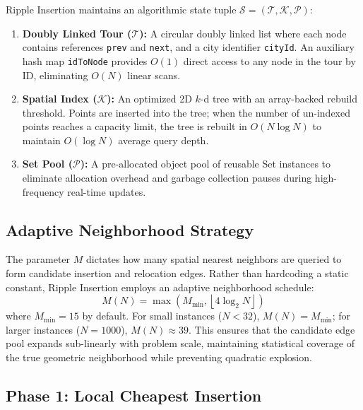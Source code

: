 \documentclass[11pt,a4paper]{article}
\theoremstyle{definition}
\begin{document}
Ripple Insertion maintains an algorithmic state tuple $\mathcal{S} = (\mathcal{T}, \mathcal{K}, \mathcal{P})$:
\begin{enumerate}
    \item \textbf{Doubly Linked Tour ($\mathcal{T}$):} A circular doubly linked list where each node contains references \texttt{prev} and \texttt{next}, and a city identifier \texttt{cityId}. An auxiliary hash map \texttt{idToNode} provides $O(1)$ direct access to any node in the tour by ID, eliminating $O(N)$ linear scans.
    \item \textbf{Spatial Index ($\mathcal{K}$):} An optimized 2D $k$-d tree \cite{bentley1975multidimensional} with an array-backed rebuild threshold. Points are inserted into the tree; when the number of un-indexed points reaches a capacity limit, the tree is rebuilt in $O(N \log N)$ to maintain $O(\log N)$ average query depth.
    \item \textbf{Set Pool ($\mathcal{P}$):} A pre-allocated object pool of reusable Set instances to eliminate allocation overhead and garbage collection pauses during high-frequency real-time updates.
\end{enumerate}

\subsection{Adaptive Neighborhood Strategy}

The parameter $M$ dictates how many spatial nearest neighbors are queried to form candidate insertion and relocation edges. Rather than hardcoding a static constant, Ripple Insertion employs an adaptive neighborhood schedule:
\begin{equation}
M(N) = \max\left(M_{\min}, \left\lfloor 4 \log_2 N \right\rfloor\right)
\end{equation}
where $M_{\min} = 15$ by default. For small instances ($N < 32$), $M(N) = M_{\min}$; for larger instances ($N = 1000$), $M(N) \approx 39$. This ensures that the candidate edge pool expands sub-linearly with problem scale, maintaining statistical coverage of the true geometric neighborhood while preventing quadratic explosion.

\subsection{Phase 1: Local Cheapest Insertion}
\end{document}
